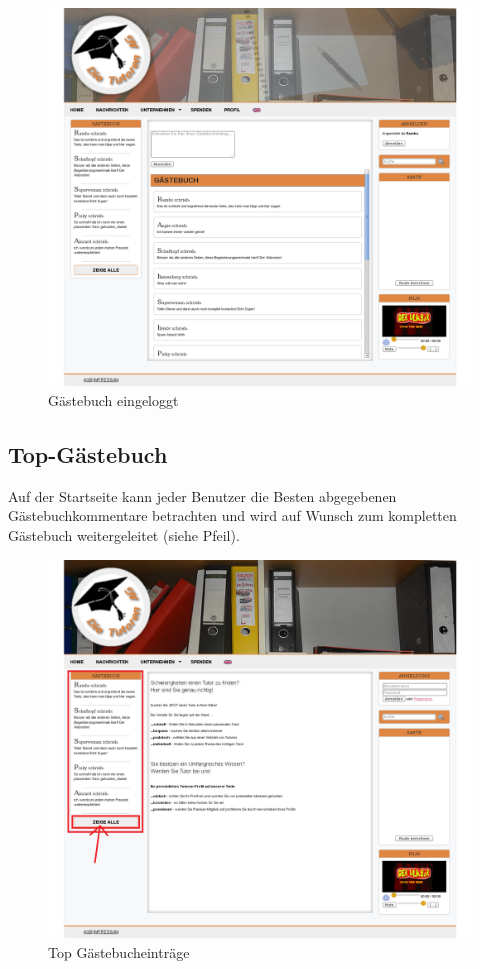 \begin{figure}[!htbp]
\centering
\includegraphics[width=1\linewidth]{../Screenshots/de/Gaestebuch_logged_in}
\caption{Gästebuch eingeloggt}
\label{fig:Gaestebuch_logged_in}
\end{figure}


\newpage

\subsection{Top-Gästebuch}

Auf der Startseite kann jeder Benutzer die Besten abgegebenen Gästebuchkommentare betrachten und wird auf Wunsch zum kompletten Gästebuch weitergeleitet (siehe Pfeil).

\begin{figure}[!htbp]
\centering
\includegraphics[width=1\linewidth]{../Screenshots/de/TopGaestebuch}
\caption{Top Gästebucheinträge}
\label{fig:TopGaestebuch}
\end{figure}
